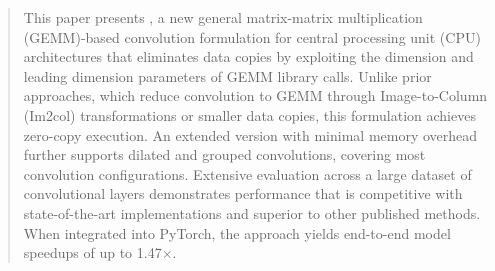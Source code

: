 \begin{abstract}

This paper presents \algname, a new general matrix-matrix multiplication (GEMM)-based convolution formulation for central processing unit (CPU) architectures that eliminates data copies by exploiting the dimension and leading dimension parameters of GEMM library calls.
Unlike prior approaches, which reduce convolution to GEMM through Image-to-Column (Im2col) transformations or smaller data copies, this formulation achieves zero-copy execution. 
An extended version with minimal memory overhead further supports dilated and grouped convolutions, covering most convolution configurations.
Extensive evaluation across a large dataset of convolutional layers demonstrates performance that is competitive with state-of-the-art implementations and superior to other published methods.
When integrated into PyTorch, the approach yields end-to-end model speedups of up to 1.47$\times$.

\end{abstract}